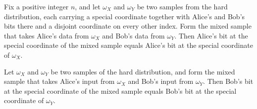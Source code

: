 \begin{theorem}
\label{CommunicationComplexity.Functions.Disjointness.RandomizedLowerBound.specialX_mix}
\leanok
{}
Fix a positive integer $n$, and let $\omega_X$ and $\omega_Y$ be two samples from the
hard distribution, each carrying a special coordinate together with Alice's and Bob's
bits there and a disjoint coordinate on every other index. Form the mixed sample that
takes Alice's data from $\omega_X$ and Bob's data from $\omega_Y$. Then Alice's bit at
the special coordinate of the mixed sample equals Alice's bit at the special coordinate
of $\omega_X$.
\end{theorem}

\begin{theorem}
\label{CommunicationComplexity.Functions.Disjointness.RandomizedLowerBound.specialY_mix}
\leanok
{}
Let $\omega_X$ and $\omega_Y$ be two samples of the hard distribution, and form the
mixed sample that takes Alice's input from $\omega_X$ and Bob's input from $\omega_Y$.
Then Bob's bit at the special coordinate of the mixed sample equals Bob's bit at the
special coordinate of $\omega_Y$.
\end{theorem}

